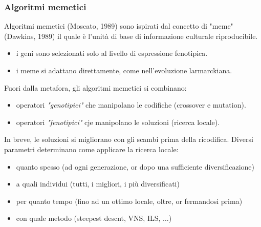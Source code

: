 \documentclass{article}
\begin{document}
\subsubsection{Algoritmi memetici}
Algoritmi memetici (Moscato, 1989) sono ispirati dal concetto di "meme" (Dawkins, 1989)
il quale è l'unità di base di informazione culturale riproducibile.
\begin{itemize}
    \item i geni sono selezionati solo al livello di espressione fenotipica.
    \item i meme si adattano direttamente, come nell'evoluzione larmarckiana.
\end{itemize}
Fuori dalla metafora, gli algoritmi memetici si combinano:
\begin{itemize}
    \item operatori \textit{"genotipici"} che manipolano le codifiche (crossover e mutation).
    \item operatori \textit{"fenotipici"} cje manipolano le soluzioni (ricerca locale).
\end{itemize}
In breve, le soluzioni si migliorano con gli scambi prima della ricodifica. Diversi
parametri determinano come applicare la ricerca locale:
\begin{itemize}
    \item quanto spesso (ad ogni generazione, or dopo una sufficiente diversificazione)
    \item a quali individui (tutti, i migliori, i più diversificati)
    \item per quanto tempo (fino ad un ottimo locale, oltre, or fermandosi prima)
    \item con quale metodo (steepest descnt, VNS, ILS, $\dots$)
\end{itemize}
\end{document}
